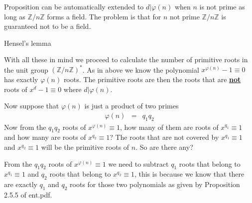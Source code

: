 \documentclass[aps,preprint,preprintnumbers,nofootinbib,showpacs,prd]{revtex4-1}
\newcommand{\nbea}{\begin{eqnarray*}}
\newcommand{\neea}{\end{eqnarray*}}
\begin{document}
Proposition can be automatically extended to $d|\varphi(n)$ when $n$ is not prime as long as $\mathbb{Z}/n\mathbb{Z}$ forms a field. The problem is that for $n$ not prime $\mathbb{Z}/n\mathbb{Z}$ is guaranteed not to be a field.

Hensel's lemma



With all these in mind we proceed to calculate the number of primitive roots in the unit group $(\mathbb{Z}/n\mathbb{Z})^*$. As in above we know the polynomial $x^{\varphi(n)} - 1 \equiv 0$ has exactly $\varphi(n)$ roots. The primitive roots are then the roots that are \underline{{\bf not}} roots of $x^d - 1 \equiv 0$ where $d|\varphi(n)$.

Now suppose that $\varphi(n)$ is just a product of two primes
%
\nbea
\varphi(n) & = & q_1q_2
\neea
%
Now from the $q_1q_2$ roots of $x^{\varphi(n)} \equiv 1$, how many of them are roots of $x^{q_1} \equiv 1$ and how many are roots of $x^{q_2} \equiv 1$? The roots that are not covered by $x^{q_{1}} \equiv 1$ and $x^{q_{2}} \equiv 1$ will be the primitive roots of $n$. So are there any?

From the $q_1q_2$ roots of $x^{\varphi(n)} \equiv 1$ we need to subtract $q_1$ roots that belong to $x^{q_1} \equiv 1$ and $q_2$ roots that belong to $x^{q_2} \equiv 1$, this is because we know that there are exactly $q_1$ and $q_2$ roots for those two polynomials as given by Proposition 2.5.5 of ent.pdf.
\end{document}
